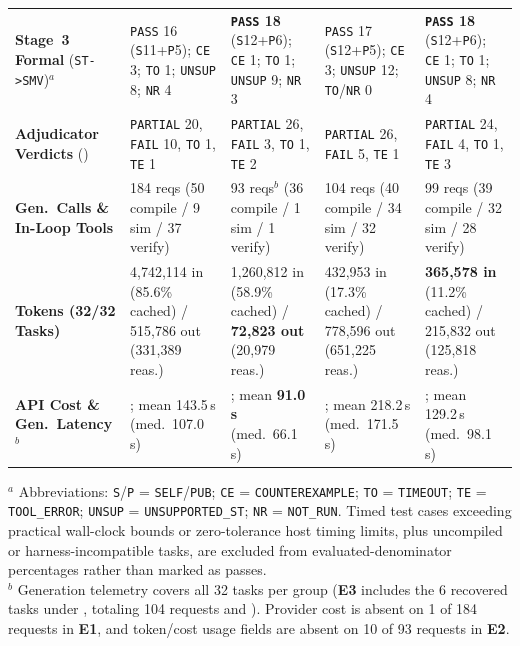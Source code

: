 \begin{table}[htbp]
\begin{tabularx}{\textwidth}{@{}>{\raggedright\arraybackslash}p{}YYYY@{}}
\textbf{Stage~3 Formal} (\texttt{ST->SMV})$^{a}$ & \texttt{PASS} 16 (\texttt{S}11+\texttt{P}5); \texttt{CE} 3; \texttt{TO} 1; \texttt{UNSUP} 8; \texttt{NR} 4 & \textbf{\texttt{PASS} 18} (\texttt{S}12+\texttt{P}6); \texttt{CE} 1; \texttt{TO} 1; \texttt{UNSUP} 9; \texttt{NR} 3 & \texttt{PASS} 17 (\texttt{S}12+\texttt{P}5); \texttt{CE} 3; \texttt{UNSUP} 12; \texttt{TO}/\texttt{NR} 0 & \textbf{\texttt{PASS} 18} (\texttt{S}12+\texttt{P}6); \texttt{CE} 1; \texttt{TO} 1; \texttt{UNSUP} 8; \texttt{NR} 4 \\
\textbf{Adjudicator Verdicts} () & \texttt{PARTIAL} 20, \texttt{FAIL} 10, \texttt{TO} 1, \texttt{TE} 1 & \texttt{PARTIAL} 26, \texttt{FAIL} 3, \texttt{TO} 1, \texttt{TE} 2 & \texttt{PARTIAL} 26, \texttt{FAIL} 5, \texttt{TE} 1 & \texttt{PARTIAL} 24, \texttt{FAIL} 4, \texttt{TO} 1, \texttt{TE} 3 \\
\textbf{Gen.\ Calls \& In-Loop Tools} & 184 reqs (50 compile / 9 sim / 37 verify) & 93 reqs$^{b}$ (36 compile / 1 sim / 1 verify) & 104 reqs (40 compile / 34 sim / 32 verify) & 99 reqs (39 compile / 32 sim / 28 verify) \\
\textbf{Tokens (32/32 Tasks)} & 4,742,114 in (85.6\% cached) / 515,786 out (331,389 reas.) & 1,260,812 in (58.9\% cached) / \textbf{72,823 out} (20,979 reas.) & 432,953 in (17.3\% cached) / 778,596 out (651,225 reas.) & \textbf{365,578 in} (11.2\% cached) / 215,832 out (125,818 reas.) \\
\textbf{API Cost \& Gen.\ Latency}$^{b}$ & \textbf{}; mean 143.5\,s (med.\ 107.0\,s) & \textbf{}; mean \textbf{91.0\,s} (med.\ 66.1\,s) & \textbf{}; mean 218.2\,s (med.\ 171.5\,s) & \textbf{}; mean 129.2\,s (med.\ 98.1\,s) \\
\bottomrule
\end{tabularx}
\par\vspace{3pt}
\raggedright\scriptsize
$^{a}$ Abbreviations: \texttt{S}/\texttt{P} = \texttt{SELF}/\texttt{PUB}; \texttt{CE} = \texttt{COUNTEREXAMPLE}; \texttt{TO} = \texttt{TIMEOUT}; \texttt{TE} = \texttt{TOOL\_ERROR}; \texttt{UNSUP} = \texttt{UNSUPPORTED\_ST}; \texttt{NR} = \texttt{NOT\_RUN}. Timed test cases exceeding practical wall-clock bounds or zero-tolerance host timing limits, plus uncompiled or harness-incompatible tasks, are excluded from evaluated-denominator percentages rather than marked as passes.\\
$^{b}$ Generation telemetry covers all 32 tasks per group (\textbf{E3} includes the 6 recovered tasks under , totaling 104 requests and ). Provider cost is absent on 1 of 184 requests in \textbf{E1}, and token/cost usage fields are absent on 10 of 93 requests in \textbf{E2}.
\end{table}